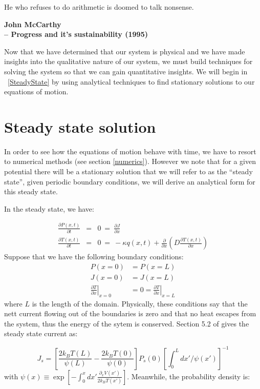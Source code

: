 \epigraph{He who refuses to do arithmetic is doomed to talk nonsense.}{\textbf{John McCarthy \\ -- Progress and it's sustainability (1995)}}
Now that we have determined that our system is physical and we have made insights into the qualitative nature of our system, we must build techniques for solving the system so that we can gain quantitative insights. We will begin in ~\autoref{SteadyState} by using analytical techniques to find stationary solutions to our equations of motion.
\section{Steady state solution} \label{SteadyState}
In order to see how the equations of motion behave with time, we have to resort to numerical methods (see section \ref{numerics}). However we note that for a given potential there will be a stationary solution that we will refer to as the ``steady state'', given periodic boundary conditions, we will derive an analytical form for this steady state.

In the steady state, we have:

\begin{eqnarray}
\frac{\partial P(x, t)}{\partial t} &=&  0 \ = \ \frac{\partial J}{\partial x} \label{eqn:SmoluchowskiSteady} \\
\frac{\partial T(x, t)}{\partial t} &=& 0 \ = \ -\kappa q(x,t) + \frac{\partial}{\partial x} \left ( D \frac{\partial T(x, t)}{\partial x} \right ) \label{eqn:TemperatureSteady}
\end{eqnarray}
Suppose that we have the following boundary conditions:
\begin{align}
P(x = 0) & = P(x = L) \\
J(x = 0) & = J(x = L) \\
\left. \frac{\partial T}{\partial x} \right \rvert_{x = 0} & = 0 = \left. \frac{\partial T}{\partial x} \right \rvert_{x = L} \label{eqn:temperatureBoundary}
\end{align}
where $L$ is the length of the domain. Physically, these conditions say that the nett current flowing out of the boundaries is zero and that no heat escapes from the system, thus the energy of the sytem is conserved. Section 5.2 of \cite{Gardiner2009} gives the steady state current as:

\begin{equation}
J_s = \left [\frac{2 k_B T(L)}{\psi(L)} - \frac{2 k_B T(0)}{\psi(0)}  \right] P_s(0) \left [\int_0^L dx'/\psi(x') \right]^{-1}
\label{eqn:SteadyCurrent}
\end{equation}
with $\psi(x) \equiv \exp[-\int_0^x dx' \frac{\partial_x V(x')}{2 k_B T(x')}]$. Meanwhile, the probability density is:

